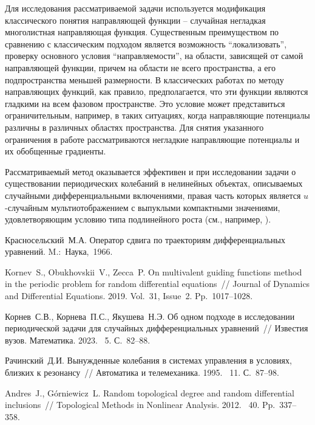 Для исследования рассматриваемой задачи используется модификация классического понятия направляющей функции -- случайная негладкая многолистная направляющая функция. Существенным преимуществом по сравнению с классическим подходом является возможность ``локализовать'', проверку основного условия ``направляемости'', на области, зависящей от самой направляющей функции, причем на области не всего пространства, а его подпространства меньшей размерности. В классических работах по методу направляющих функций, как правило, предполагается, что эти функции являются гладкими на всем фазовом пространстве. Это условие может представиться ограничительным, например, в таких ситуациях, когда направляющие потенциалы различны в различных областях пространства. Для снятия указанного ограничения в работе рассматриваются негладкие направляющие потенциалы и их обобщенные градиенты.

Рассматриваемый метод оказывается эффективен и при исследовании задачи о существовании периодических колебаний в нелинейных объектах, описываемых случайными дифференциальными включениями, правая часть которых является $u$-случайным мультиотображением с выпуклыми компактными значениями, удовлетворяющим условию типа подлинейного роста (см., например, \cite{k_a}).


%

\begin{thebibliography}{9} %

 Красносельский~М.А. Оператор сдвига по траекториям дифференциальных уравнений. M.:~Наука,~1966.

 Kornev~S., Obukhovskii~V., Zecca~P. On multivalent guiding functions method in the periodic problem for random differential equations~// Journal of Dynamics and Differential Equations. 2019. Vol.~31, Issue~2. Pp.~1017--1028.

 Корнев~С.В., Корнева~П.С., Якушева~Н.Э. Об одном подходе в исследовании периодической задачи для случайных дифференциальных уравнений~// Известия вузов. Математика. 2023. \textnumero~5. С.~82--88.

 Рачинский~Д.И. Вынужденные колебания в системах управления в условиях, близких к резонансу~// Автоматика и телемеханика. 1995. \textnumero~11. С.~87--98.

 Andres~J., G\'orniewicz~L. Random topological degree and random differential inclusions~// Topological Methods in Nonlinear Analysis. 2012. \textnumero~40. Pp.~337--358.

\end{thebibliography}





%
